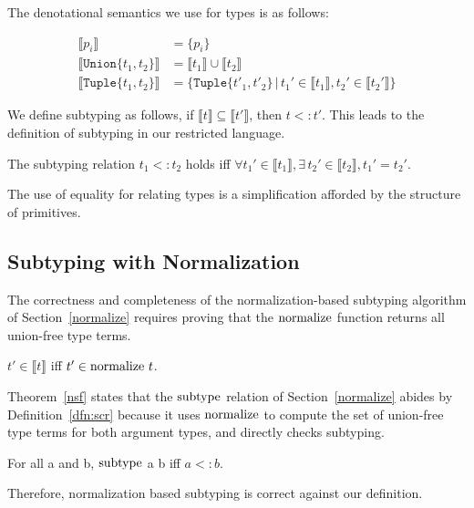\documentclass[a4paper,english]{lipics-v2019}
\newcommand{\xt}[1]{\texttt{#1}}
\newcommand{\tuplet}[2]{\xt{Tuple\{}#1,#2\xt{\}}}
\newcommand{\union}[2]{\xt{Union\{}#1,#2\xt{\}}}
\newcommand{\denotes}[1]{\llbracket #1 \rrbracket}
\renewcommand{\c}[1]{\ensuremath{\text{\lstinline{#1}}}\xspace}
\begin{document}
The denotational semantics we use for types is as follows:

\vspace{-5mm}
\begin{align*}
\denotes{p_i} &= \{p_i\} \\
\denotes{\union{t_1}{t_2}} &= \denotes{t_1} \cup \denotes{t_2} \\
\denotes{\tuplet{t_1}{t_2}} &= \{\tuplet{t'_1}{t'_2} \,|\, t_1' \in \denotes{t_1},  t_2' \in \denotes{t_2'}\}
\end{align*}
\vspace{-5mm}

\noindent
We define subtyping as follows, if $\denotes{t}\subseteq\denotes{t'}$, then
$t<:t'$.  This leads to the definition of subtyping in our restricted language.

\begin{definition}
The subtyping relation $t_1 <: t_2$ holds iff $\forall t_1' \in
\denotes{t_1}, \exists\, t_2' \in \denotes{t_2}, t_1' =
t_2'$.\label{dfn:scr}
\end{definition}

\noindent
The use of equality for relating types is a simplification afforded by the
structure of primitives.

\subsection{Subtyping with Normalization}

The correctness and completeness of the normalization-based subtyping
algorithm of Section~\ref{normalize} requires proving that the \c{normalize}
function returns all union-free type terms.

\begin{lemma}[NF Equivalence]\label{lem:equiv_ndet}
$t' \in \denotes{t}$ iff $t' \in \c{normalize}~ t$.
\end{lemma}

\noindent
Theorem~\ref{nsf} states that the \c{subtype} relation of
Section~\ref{normalize} abides by Definition~\ref{dfn:scr} because it uses
\c{normalize} to compute the set of union-free type terms for both argument
types, and directly checks subtyping.

\begin{theorem}[NF Subtyping]\label{nsf}
For all  a and b, \c{subtype} a b iff $a <: b$.
\end{theorem}

\noindent
Therefore, normalization based subtyping is correct against our definition.
\end{document}
